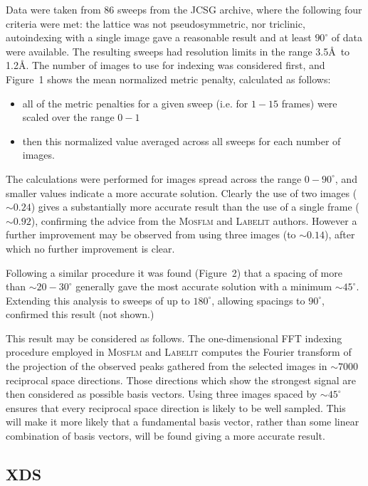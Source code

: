 \documentclass[a4paper, 11pt]{article}
\begin{document}
Data were taken from 86 sweeps from the JCSG archive, where  the
following four
criteria were met: the lattice was not pseudosymmetric, nor triclinic,
autoindexing with a single image gave a reasonable result and
at least $90^{\circ}$ of data were available. The resulting sweeps had 
resolution limits in the range 3.5\AA\ to 1.2\AA. The number of images
to use for indexing was considered first, and Figure~1
shows the mean normalized metric penalty, calculated as follows:

\begin{itemize}
\item{all of the metric penalties for a
  given sweep (i.e. for $1 - 15$ frames) were scaled over the range $0 - 1$}
\item{then this normalized
  value averaged across all sweeps for each number of images.}
\end{itemize}

\noindent
The calculations were performed for
images spread across the range $0 - 90^{\circ}$, and
smaller values indicate a more accurate solution. Clearly the use of
two images ($\sim 0.24$) gives a substantially more accurate result
than the use of a single frame ($\sim 0.92$), 
confirming the advice from the \textsc{Mosflm} and
\textsc{Labelit} authors. However a further improvement may be observed from
using three images (to $\sim 0.14$), after which no further
improvement is clear.  

Following a similar procedure it was found
(Figure~2) that a 
spacing of more than $\sim 20 - 30^{\circ}$ generally gave the most accurate
solution with a minimum $\sim 45^{\circ}$. 
Extending this analysis to sweeps of up to $180^{\circ}$, allowing
spacings to $90^{\circ}$,
confirmed this result (not shown.) 

This result may be considered as follows. The one-dimensional FFT
indexing procedure employed in \textsc{Mosflm} and \textsc{Labelit} computes the
Fourier transform of the projection of the observed peaks gathered
from the selected images in $\sim
7000$ reciprocal space directions. Those directions which show the
strongest signal are then considered as possible basis vectors. Using
three images spaced by $\sim 45^{\circ}$ ensures that every reciprocal
space direction is likely to be well sampled. This will make it more likely
that a fundamental basis vector, rather than some linear combination
of basis vectors, will be found giving a more accurate result.

\subsection{XDS}
\end{document}
